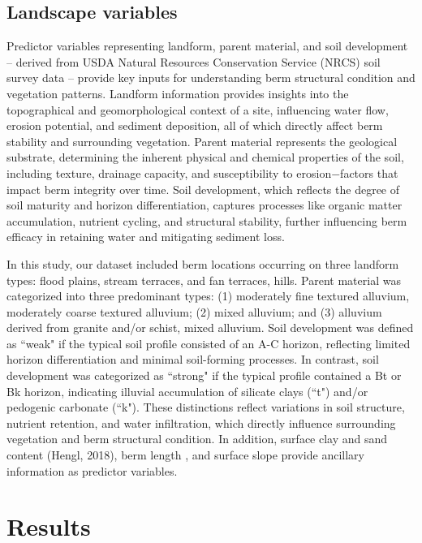 \documentclass[review]{elsarticle}
\begin{document}
\subsection{Landscape variables}

Predictor variables representing landform, parent material, and soil development -- derived from USDA Natural Resources Conservation Service (NRCS) soil survey data -- provide key inputs for understanding berm structural condition and vegetation patterns.
Landform information provides insights into the topographical and geomorphological context of a site, influencing water flow, erosion potential, and sediment deposition, all of which directly affect berm stability and surrounding vegetation. Parent material represents the geological substrate, determining the inherent physical and chemical properties of the soil, including texture, drainage capacity, and susceptibility to erosion$-$factors that impact berm integrity over time. Soil development, which reflects the degree of soil maturity and horizon differentiation, captures processes like organic matter accumulation, nutrient cycling, and structural stability, further influencing berm efficacy in retaining water and mitigating sediment loss.

In this study, our dataset included berm locations occurring on three landform types: flood plains, stream terraces, and fan terraces, hills. Parent material was categorized into three predominant types: (1) moderately fine textured alluvium, moderately coarse textured alluvium; (2) mixed alluvium; and (3) alluvium derived from granite and/or schist, mixed alluvium. Soil development was defined as ``weak" if the typical soil profile consisted of an A-C horizon, reflecting limited horizon differentiation and minimal soil-forming processes. In contrast, soil development was categorized as ``strong" if the typical profile contained a Bt or Bk horizon, indicating illuvial accumulation of silicate clays (``t") and/or pedogenic carbonate (``k"). These distinctions reflect variations in soil structure, nutrient retention, and water infiltration, which directly influence surrounding vegetation and berm structural condition. In addition, surface clay and sand content (Hengl, 2018), berm length \citep{nichols2021landscape}, and surface slope provide ancillary information as predictor variables.            

\section{Results}
\end{document}
